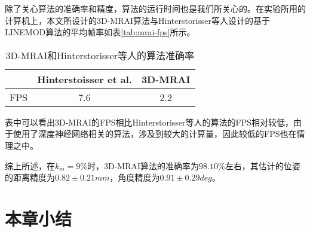 除了关心算法的准确率和精度，算法的运行时间也是我们所关心的。在实验所用的计算机上，本文所设计的3D-MRAI算法与Hinterstorisser等人设计的基于LINEMOD算法的平均帧率如表\ref{tab:mrai-fps}所示。
\begin{table}[ht]
  \centering
  \begin{tabular}{ccc}
    \toprule
    &Hinterstoisser et al.&\bf{3D-MRAI}\\
    \midrule
    FPS&7.6&2.2\\
    \bottomrule
  \end{tabular}
  \caption{3D-MRAI和Hinterstorisser等人的算法准确率}
  \label{tab:mrai}
\end{table}
表中可以看出3D-MRAI的FPS相比Hinterstorisser等人的算法的FPS相对较低，由于使用了深度神经网络相关的算法，涉及到较大的计算量，因此较低的FPS也在情理之中。

综上所述，在$k_m=9\%$时，3D-MRAI算法的准确率为$98.10\%$左右，其估计的位姿的距离精度为$0.82\pm0.21mm$，角度精度为$0.91\pm0.29deg$。

\section{本章小结}


